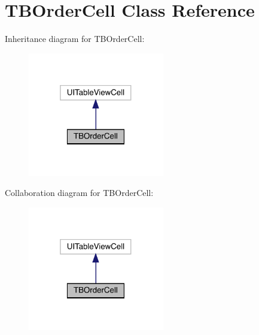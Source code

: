 \hypertarget{interface_t_b_order_cell}{}\section{T\+B\+Order\+Cell Class Reference}
\label{interface_t_b_order_cell}


Inheritance diagram for T\+B\+Order\+Cell\+:\nopagebreak
\begin{figure}[H]
\begin{center}
\leavevmode
\includegraphics[width=169pt]{interface_t_b_order_cell__inherit__graph}
\end{center}
\end{figure}


Collaboration diagram for T\+B\+Order\+Cell\+:\nopagebreak
\begin{figure}[H]
\begin{center}
\leavevmode
\includegraphics[width=169pt]{interface_t_b_order_cell__coll__graph}
\end{center}
\end{figure}
